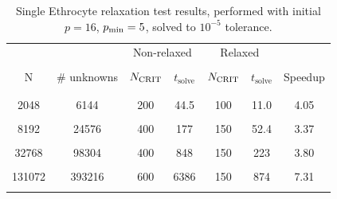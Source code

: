 \begin{table}[htdp]
\begin{center}
\begin{tabular}{c|c|c|c|c|c|c}

 & & \multicolumn{2}{c|}{Non-relaxed} & \multicolumn{2}{c|}{Relaxed} \\
 & & \multicolumn{2}{c|}{} & \multicolumn{2}{c|}{} \\
 N & \# unknowns & $N_{\text{CRIT}}$ & $t_{\text{solve}}$ & $N_{\text{CRIT}}$ & $t_{\text{solve}}$ & Speedup \\
 & & & & & \\ \hline
 & & & & & \\
 2048 & 6144 & 200 & 44.5 & 100 & 11.0 & 4.05 \\
 & & & & & \\
 8192 & 24576 & 400 & 177 & 150 & 52.4 & 3.37 \\
 & & & & & \\
 32768 & 98304 & 400 & 848 & 150 & 223 & 3.80 \\
 & & & & & \\
 131072 & 393216 & 600 & 6386\footnotemark[1] & 150 & 874 & 7.31\footnotemark[1] \\
 & & & & & \\
	
\end{tabular}
\end{center}
\caption{Single Ethrocyte relaxation test results, performed with initial $p=16$, $p_{\text{min}}=5$, solved to $10^{-5}$ tolerance.}
\label{tab:single_cell_relaxation_results}
\end{table}%


